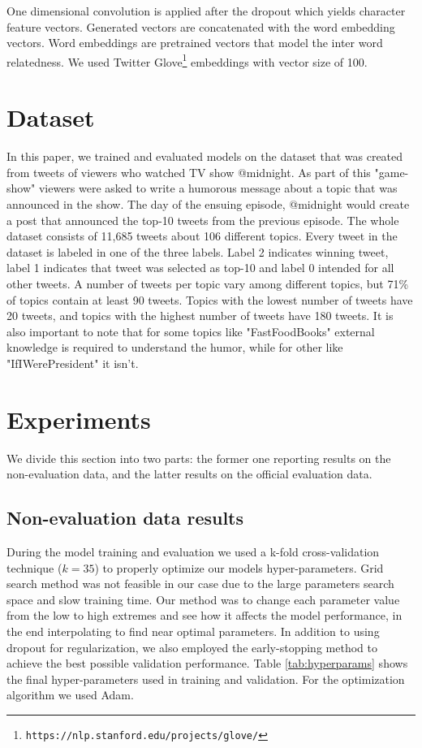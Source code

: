 \documentclass[10pt, a4paper]{article}
\begin{document}
One dimensional convolution is applied after the dropout which yields character
feature vectors. Generated vectors are concatenated with the word embedding
vectors. Word embeddings are pretrained vectors that model the inter word
relatedness. We used Twitter
Glove\citep{GLove}\footnote{\texttt{https://nlp.stanford.edu/projects/glove/}}
embeddings with vector size of 100.

\section{Dataset}
In this paper, we trained and evaluated models on the dataset that was created from tweets of viewers who watched TV show @midnight. As part of this "game-show" viewers were asked to write a humorous message about a topic that was announced in the show. The day of the ensuing episode, @midnight would create a post that announced the top-10 tweets from the previous episode. The whole dataset consists of 11,685 tweets about 106 different topics. Every tweet in the dataset is labeled in one of the three labels. Label 2 indicates winning tweet, label 1 indicates that tweet was selected as top-10 and label 0 intended for all other tweets. A number of tweets per topic vary among different topics, but 71\% of topics contain at least 90 tweets. Topics with the lowest number of tweets have 20 tweets, and topics with the highest number of tweets have 180 tweets. It is also important to note that for some topics like "FastFoodBooks" external knowledge is required to understand the humor, while for other like "IfIWerePresident" it isn't.

\section{Experiments}
We divide this section into two parts: the former one reporting results on the
non-evaluation data, and the latter results on the official evaluation data.

\subsection{Non-evaluation data results}
During the model training and evaluation we used a k-fold cross-validation technique
($k=35$) to properly optimize our models hyper-parameters. Grid search
method was not feasible in our case due to the large parameters
search space and slow training time. Our method was to change each parameter
value from the low to high extremes and see how it affects the model
performance, in the end interpolating to find near optimal parameters. 
In addition to using dropout for regularization, we also employed the
early-stopping\cite{early_stopping} method to achieve the best possible validation
performance. Table \ref{tab:hyperparams} shows the final hyper-parameters used
in training and validation. For the optimization algorithm we used
Adam\cite{Adam}.
\end{document}
